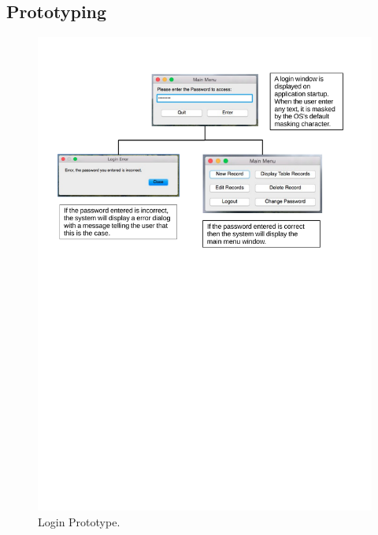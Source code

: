 \begin{landscape}
    \section{Prototyping}
    \begin{figure}[H]
        \centerline{\includegraphics[width=500px]{./Design/Prototyping/Login_prototyping.pdf}}
        \caption{Login Prototype.} \label{fig:relationship_diagram}
    \end{figure}
\end{landscape}


